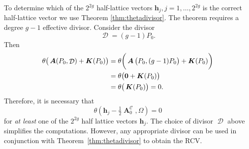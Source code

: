 \documentclass[12pt]{article}
\theoremstyle{definition}
\DeclareMathOperator{\DivC}{\mathcal{C}}
\DeclareMathOperator{\DivD}{\mathcal{D}}
\DeclareMathOperator{\RCV}{\boldsymbol{K}}
\DeclareMathOperator{\Abel}{\boldsymbol{A}}
\begin{document}
To determine which of the $2^{2g}$ half-lattice vectors
$\boldsymbol{h}_j, j = 1, \ldots, 2^{2g}$ is the correct half-lattice
vector we use Theorem \ref{thm:thetadivisor}. The theorem requires a
degree $g-1$ effective divisor. Consider the divisor
\begin{equation} \label{eqn:simple-effective-divisor}
  \DivD = (g-1)P_0.
\end{equation}
Then
\begin{align}
  \theta\big(\Abel(P_0,\DivD) + \RCV(P_0)\big) \notag
  &=
  \theta\bigg(\Abel\big(P_0,(g-1)P_0\big) + \RCV(P_0)\bigg) \notag \\
  &=
  \theta\big(\boldsymbol{0} + \RCV(P_0)\big) \notag \\
  &=
  \theta\big(\RCV(P_0)\big) = 0.
\end{align}
Therefore, it is necessary that
\begin{equation}
  \theta\left(
  \boldsymbol{h}_j - \tfrac{1}{2} \Abel_0^{\DivC}, \Omega
  \right) = 0
\end{equation}
for {\it at least} one of the $2^{2g}$ half lattice vectors
$\boldsymbol{h}_j$. The choice of divisor $\DivD$ above simplifies the
computations. However, any appropriate divisor can be used in
conjunction with Theorem~\ref{thm:thetadivisor} to obtain the RCV.
\end{document}

